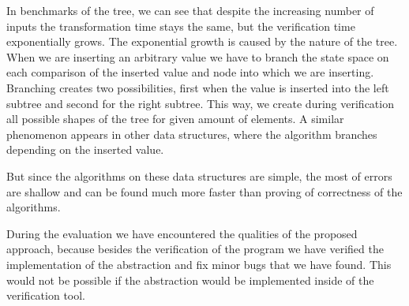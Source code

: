 In benchmarks of the \AVL tree, we can see that despite the increasing number of inputs
the transformation time stays the same, but the verification time exponentially
grows. The exponential growth is caused by the nature of the \AVL tree. When we
are inserting an arbitrary value we have to branch the state space on each
comparison of the inserted value and node into which we are inserting. Branching
creates two possibilities, first when the value is inserted into the left
subtree and second for the right subtree. This way, we create during
verification all possible shapes of the \AVL tree for given amount of elements.
A similar phenomenon appears in other data structures, where the algorithm branches
depending on the inserted value.

But since the algorithms on these data structures are simple, the most of errors
are shallow and can be found much more faster than proving of correctness of
the algorithms.

During the evaluation we have encountered the qualities of the proposed
approach, because besides the verification of the program we have verified the
implementation of the abstraction and fix minor bugs that we have found. This
would not be possible if the abstraction would be implemented inside of the
verification tool.
